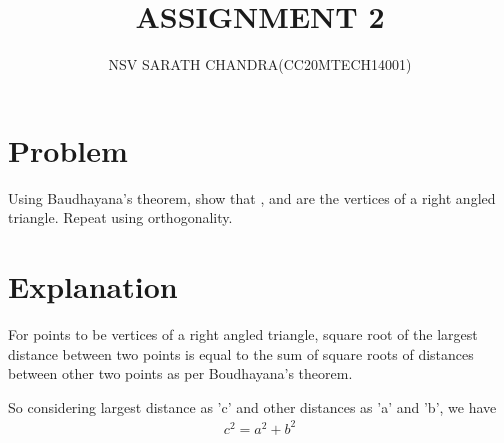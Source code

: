 \documentclass[journal,12pt,twocolumn]{IEEEtran}
\begin{document}
\title{ASSIGNMENT 2}
\author{NSV SARATH CHANDRA(CC20MTECH14001)}
\maketitle
\newpage
\bigskip
\renewcommand{\thefigure}{\theenumi}
\renewcommand{\thetable}{\theenumi}

	
\section{Problem}
Using Baudhayana's theorem, show that ,  and  are the vertices of a right angled triangle. Repeat using orthogonality.  


\section{Explanation}\label{Explanation}

For points to be vertices of a right angled triangle, square root of the largest distance between two points is equal to the sum of square roots of distances between other two points as per Boudhayana's theorem. 

So considering largest distance as 'c' and other distances as 'a' and 'b', we have 
\begin{align}
c^2 = a^2  + b^2
\end{align}
\end{document}
